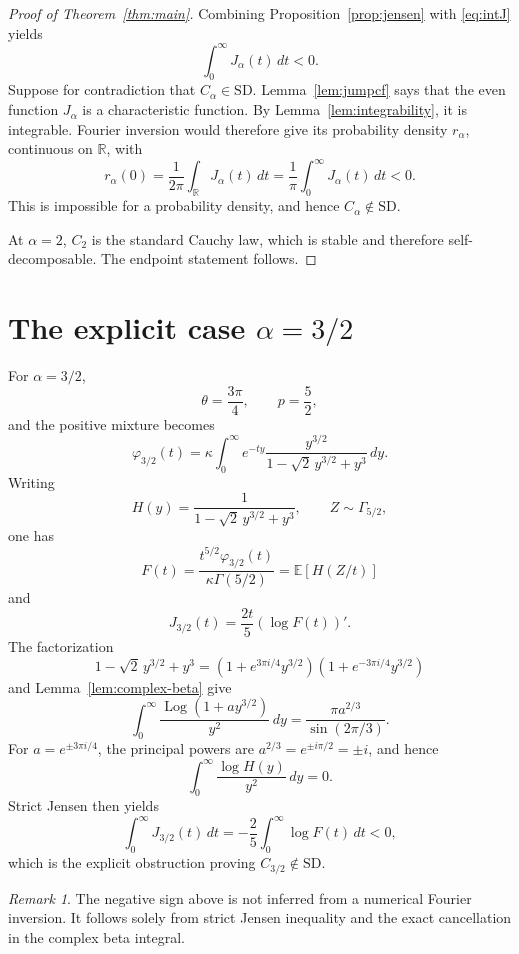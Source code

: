 \documentclass[11pt]{article}
\theoremstyle{remark}
\newtheorem{remark}[theorem]{Remark}
\newcommand{\R}{\mathbb{R}}
\newcommand{\E}{\mathbb{E}}
\newcommand{\SD}{\mathrm{SD}}
\newcommand{\Log}{\operatorname{Log}}
\begin{document}
\begin{proof}[Proof of Theorem~\ref{thm:main}]
Combining Proposition~\ref{prop:jensen} with
\eqref{eq:intJ} yields
\begin{equation}\label{eq:negative-integral}
 \int_0^\infty J_\alpha(t)\,dt<0.
\end{equation}
Suppose for contradiction that $C_\alpha\in\SD$.
Lemma~\ref{lem:jumpcf} says that the even function $J_\alpha$ is a
characteristic function.  By Lemma~\ref{lem:integrability}, it is
integrable.  Fourier inversion would therefore give its probability
density $r_\alpha$, continuous on $\R$, with
\[
 r_\alpha(0)
 =\frac1{2\pi}\int_{\R}J_\alpha(t)\,dt
 =\frac1\pi\int_0^\infty J_\alpha(t)\,dt<0.
\]
This is impossible for a probability density, and hence
$C_\alpha\notin\SD$.

At $\alpha=2$, $C_2$ is the standard Cauchy law, which is stable and
therefore self-decomposable.  The endpoint statement follows.
\end{proof}

\section{The explicit case \texorpdfstring{$\alpha=3/2$}{alpha=3/2}}

For $\alpha=3/2$,
\[
 \theta=\frac{3\pi}{4},
 \qquad p=\frac52,
\]
and the positive mixture becomes
\[
 \varphi_{3/2}(t)
 =\kappa\int_0^\infty e^{-ty}
  \frac{y^{3/2}}
  {1-\sqrt2\,y^{3/2}+y^3}\,dy.
\]
Writing
\[
 H(y)=\frac1{1-\sqrt2\,y^{3/2}+y^3},
 \qquad Z\sim\Gamma_{5/2},
\]
one has
\[
 F(t)=\frac{t^{5/2}\varphi_{3/2}(t)}
 {\kappa\Gamma(5/2)}
 =\E[H(Z/t)]
\]
and
\[
 J_{3/2}(t)=\frac{2t}{5}(\log F(t))'.
\]
The factorization
\[
 1-\sqrt2\,y^{3/2}+y^3
 =(1+e^{3\pi i/4}y^{3/2})
  (1+e^{-3\pi i/4}y^{3/2})
\]
and Lemma~\ref{lem:complex-beta} give
\[
 \int_0^\infty
  \frac{\Log(1+a y^{3/2})}{y^2}\,dy
 =\frac{\pi a^{2/3}}{\sin(2\pi/3)}.
\]
For $a=e^{\pm3\pi i/4}$, the principal powers are
$a^{2/3}=e^{\pm i\pi/2}=\pm i$, and hence
\[
 \int_0^\infty\frac{\log H(y)}{y^2}\,dy=0.
\]
Strict Jensen then yields
\[
 \int_0^\infty J_{3/2}(t)\,dt
 =-\frac25\int_0^\infty\log F(t)\,dt<0,
\]
which is the explicit obstruction proving
$C_{3/2}\notin\SD$.

\begin{remark}
The negative sign above is not inferred from a numerical Fourier
inversion.  It follows solely from strict Jensen inequality and the
exact cancellation in the complex beta integral.
\end{remark}
\end{document}
